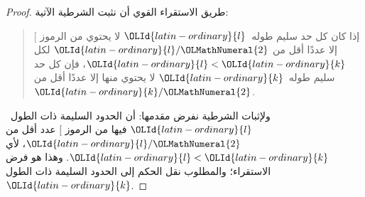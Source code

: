 \documentclass[../../../include/open-logic-section]{subfiles}
\begin{document}
\begin{proof}
طريق الاستقراء القوي أن نثبت الشرطية الآتية:
\begin{quote}
  إذا كان كل حد سليم طوله~$\OLId{latin-ordinary}{l}$ لا يحتوي من الرموز $[$ إلا عددًا أقل من
  $\OLId{latin-ordinary}{l}/\OLMathNumeral{2}$ لكل $\OLId{latin-ordinary}{l} < \OLId{latin-ordinary}{k}$، فإن كل حد سليم طوله~$\OLId{latin-ordinary}{k}$ لا يحتوي منها إلا
  عددًا أقل من $\OLId{latin-ordinary}{k}/\OLMathNumeral{2}$.
\end{quote}
ولإثبات الشرطية نفرض مقدمها: أن الحدود السليمة ذات الطول~$\OLId{latin-ordinary}{l}$ فيها من
الرموز $[$ عدد أقل من $\OLId{latin-ordinary}{l}/\OLMathNumeral{2}$، لأي $\OLId{latin-ordinary}{l}<\OLId{latin-ordinary}{k}$. وهذا هو فرض الاستقراء؛
والمطلوب نقل الحكم إلى الحدود السليمة ذات الطول~$\OLId{latin-ordinary}{k}$.


\end{proof}
\end{document}
